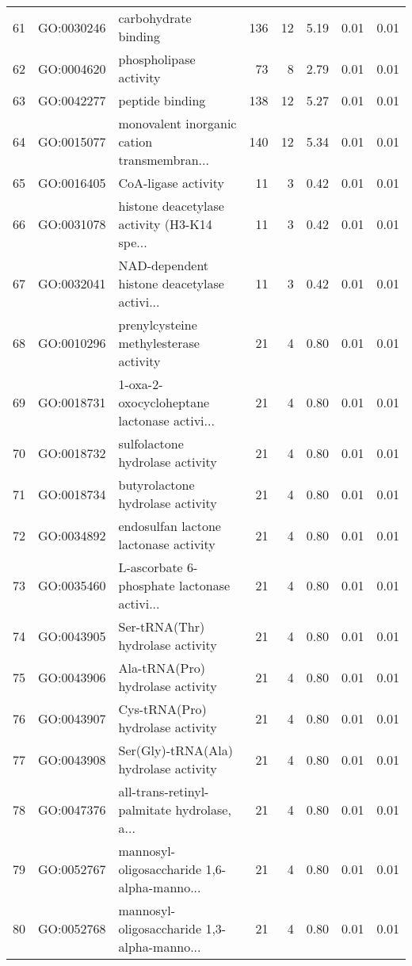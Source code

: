 \begin{table}[ht]
\begin{tabular}{rllrrrrr}
  61 & GO:0030246 & carbohydrate binding & 136 &  12 & 5.19 & 0.01 & 0.01 \\ 
  62 & GO:0004620 & phospholipase activity &  73 &   8 & 2.79 & 0.01 & 0.01 \\ 
  63 & GO:0042277 & peptide binding & 138 &  12 & 5.27 & 0.01 & 0.01 \\ 
  64 & GO:0015077 & monovalent inorganic cation transmembran... & 140 &  12 & 5.34 & 0.01 & 0.01 \\ 
  65 & GO:0016405 & CoA-ligase activity &  11 &   3 & 0.42 & 0.01 & 0.01 \\ 
  66 & GO:0031078 & histone deacetylase activity (H3-K14 spe... &  11 &   3 & 0.42 & 0.01 & 0.01 \\ 
  67 & GO:0032041 & NAD-dependent histone deacetylase activi... &  11 &   3 & 0.42 & 0.01 & 0.01 \\ 
  68 & GO:0010296 & prenylcysteine methylesterase activity &  21 &   4 & 0.80 & 0.01 & 0.01 \\ 
  69 & GO:0018731 & 1-oxa-2-oxocycloheptane lactonase activi... &  21 &   4 & 0.80 & 0.01 & 0.01 \\ 
  70 & GO:0018732 & sulfolactone hydrolase activity &  21 &   4 & 0.80 & 0.01 & 0.01 \\ 
  71 & GO:0018734 & butyrolactone hydrolase activity &  21 &   4 & 0.80 & 0.01 & 0.01 \\ 
  72 & GO:0034892 & endosulfan lactone lactonase activity &  21 &   4 & 0.80 & 0.01 & 0.01 \\ 
  73 & GO:0035460 & L-ascorbate 6-phosphate lactonase activi... &  21 &   4 & 0.80 & 0.01 & 0.01 \\ 
  74 & GO:0043905 & Ser-tRNA(Thr) hydrolase activity &  21 &   4 & 0.80 & 0.01 & 0.01 \\ 
  75 & GO:0043906 & Ala-tRNA(Pro) hydrolase activity &  21 &   4 & 0.80 & 0.01 & 0.01 \\ 
  76 & GO:0043907 & Cys-tRNA(Pro) hydrolase activity &  21 &   4 & 0.80 & 0.01 & 0.01 \\ 
  77 & GO:0043908 & Ser(Gly)-tRNA(Ala) hydrolase activity &  21 &   4 & 0.80 & 0.01 & 0.01 \\ 
  78 & GO:0047376 & all-trans-retinyl-palmitate hydrolase, a... &  21 &   4 & 0.80 & 0.01 & 0.01 \\ 
  79 & GO:0052767 & mannosyl-oligosaccharide 1,6-alpha-manno... &  21 &   4 & 0.80 & 0.01 & 0.01 \\ 
  80 & GO:0052768 & mannosyl-oligosaccharide 1,3-alpha-manno... &  21 &   4 & 0.80 & 0.01 & 0.01 \\ 

\end{tabular}
\end{table}
